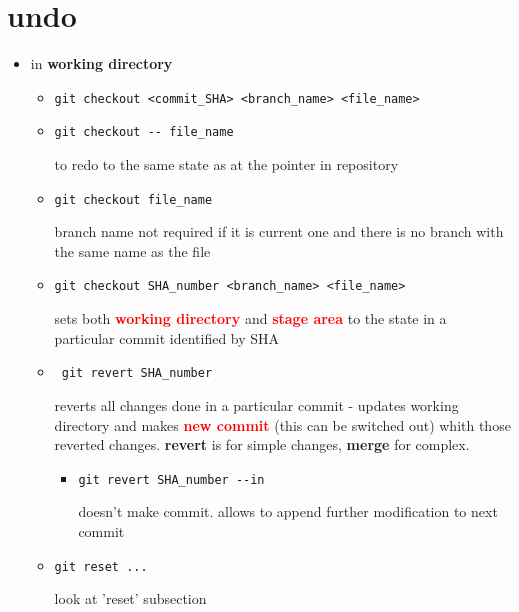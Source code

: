 \documentclass{report}
\begin{document}
\section{undo}
\begin{itemize}
\item in \textbf{working directory}
\begin{itemize}
\item\begin{verbatim}
git checkout <commit_SHA> <branch_name> <file_name>
\end{verbatim}

\item \begin{verbatim}
git checkout -- file_name
\end{verbatim} 
to redo to the same state as at the pointer in repository

\item \begin{verbatim}
git checkout file_name
\end{verbatim}
branch name not required if it is current one and there is no branch with the same name as the file

\item \begin{verbatim}
git checkout SHA_number <branch_name> <file_name>
\end{verbatim}
sets both \textcolor{red}{\textbf{working directory}} and \textcolor{red}{\textbf{stage area}} to the state in a particular commit identified by SHA

\item \begin{verbatim}
 git revert SHA_number
\end{verbatim}
reverts all changes done in a particular commit - updates working directory and makes \textcolor{red}{\textbf{new commit}} (this can be switched out) whith those reverted changes. \textbf{revert} is for simple changes, \textbf{merge} for complex. 
\begin{itemize}
\item \begin{verbatim}
git revert SHA_number --in
\end{verbatim}
doesn't make commit. allows to append further modification to next commit
\end{itemize}

\item \begin{verbatim}
git reset ...
\end{verbatim}
look at 'reset' subsection
\end{itemize}


\end{itemize}
\end{document}

